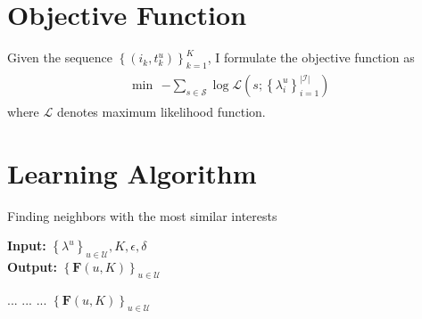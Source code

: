 \documentclass{article}
\begin{document}
\section{Objective Function}
Given the sequence $\left\{(i_k, t_k^u)\right\}_{k=1}^{K}$, I formulate the objective function as 
\begin{align}
\min \begin{matrix} -\sum_{s \in \mathcal{S}}  \log \mathcal{L} (s; \left\{\lambda_i^u \right\}_{i=1}^{|\mathcal{I}|}) \end{matrix}
\end{align} 
where $\mathcal{L}$ denotes maximum likelihood function.

\section{Learning Algorithm}

\begin{algorithm}[t]
\caption{Finding neighbors with the most similar interests} 
\hspace*{0.02in} {\bf Input:}
$\left\{ \lambda^u \right\}_{u \in \mathcal{U}} , K, \epsilon, \delta$\\
\hspace*{0.02in} {\bf Output:} 
$\left\{ \boldsymbol{F}(u, K) \right\}_{u \in \mathcal{U}}$
\begin{algorithmic}[1]
\State 
{} 
    \State 
        \State ...
    \Else
        \State ...
    \EndIf
\EndFor
{}
    \State ...
\EndWhile
\State \Return $\left\{ \boldsymbol{F}(u, K) \right\}_{u \in \mathcal{U}}$
\end{algorithmic}
\end{algorithm}
\end{document}
